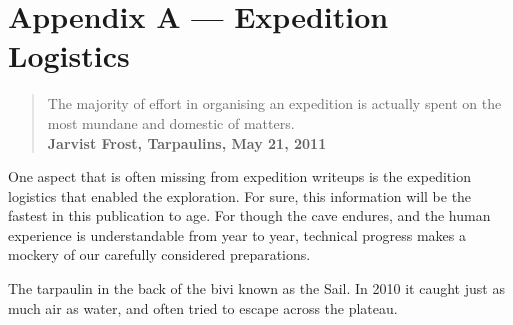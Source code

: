 \chapter{Appendix A --- Expedition
Logistics}

\begin{quote}   
The majority of effort in organising an expedition is actually spent on the most mundane and domestic of matters.\\ 
\textbf{Jarvist Frost, Tarpaulins, May 21, 2011}
\end{quote}

One aspect that is often missing from expedition writeups is the
expedition logistics that enabled the exploration. For sure, this
information will be the fastest in this publication to age. For though the cave endures, and the human experience is understandable from year to year, technical progress makes a mockery of our carefully considered preparations.

    \begin{marginfigure}
\checkoddpage \ifoddpage \forcerectofloat \else \forceversofloat \fi
\centering
 \caption{The tarpaulin in the back of the bivi known as the Sail. In 2010 it caught just as much air as water, and often tried to escape across the plateau. }
 \label{sail 2010}
\end{marginfigure}

